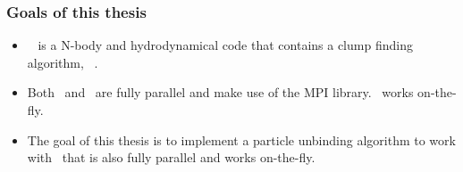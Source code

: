\begin{frame}
	\frametitle{Goals of this thesis}


	\begin{itemize}
		\item \ramses\ \parencite{ramses} is a N-body and hydrodynamical code that %
		contains a clump finding algorithm, \phew\ \parencite{PHEW}.
		
		\item Both \phew\ and \ramses\ are fully parallel and make use of the MPI library. \phew\ works on-the-fly.
		
		\item The goal of this thesis is to implement a particle unbinding algorithm to work with \phew\ that is also fully parallel and works on-the-fly.
	\end{itemize}



\end{frame}








